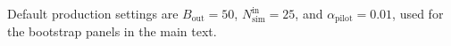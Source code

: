 \documentclass{article}
\begin{document}
Default production settings are
$B_{\mathrm{out}}=50$,
$N_{\mathrm{sim}}^{\mathrm{in}}=25$, and
$\alpha_{\mathrm{pilot}}=0.01$, used for the bootstrap panels in the
main text.




\end{document}
